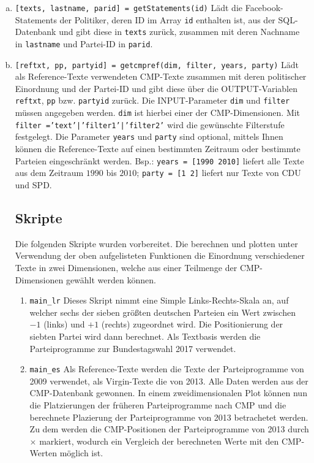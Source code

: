 \begin{enumerate}[(a)]
\item \label{getStatements} \texttt{[texts, lastname, parid] = getStatements(id)} \newline
    Lädt die Facebook-Statements der Politiker, deren ID im Array \texttt{id} enthalten ist, aus der SQL-Datenbank und gibt diese in \texttt{texts} zurück, zusammen mit deren Nachname in \texttt{lastname} und Partei-ID in \texttt{parid}.

\item \label{getcmpref} \texttt{[reftxt, pp, partyid] = getcmpref(dim, filter, years, party)} \newline
    Lädt als Reference-Texte verwendeten CMP-Texte zusammen mit deren politischer Einordnung und der Partei-ID und gibt diese über die OUTPUT-Variablen \texttt{reftxt}, \texttt{pp} bzw. \texttt{partyid} zurück. Die INPUT-Parameter \texttt{dim} und \texttt{filter} müssen angegeben werden. \texttt{dim} ist hierbei einer der CMP-Dimensionen. Mit \texttt{filter =}\linebreak\texttt{'text'|'filter1'|'filter2'} wird die gewünschte Filterstufe festgelegt. Die Parameter \texttt{years} und \texttt{party} sind optional, mittels Ihnen können die Reference-Texte auf einen bestimmten Zeitraum oder bestimmte Parteien eingeschränkt werden. Bsp.: \texttt{years = [1990 2010]} liefert alle Texte aus dem Zeitraum $1990$ bis $2010$; \texttt{party = [1 2]} liefert nur Texte von CDU und SPD.

\subsection{Skripte}
Die folgenden Skripte wurden vorbereitet. Die berechnen und plotten unter Verwendung der oben aufgelisteten Funktionen die Einordnung verschiedener Texte in zwei Dimensionen, welche aus einer Teilmenge der CMP-Dimensionen gewählt werden können.

\begin{enumerate}
\item \verb|main_lr| \newline
Dieses Skript nimmt eine Simple Links-Rechts-Skala an, auf welcher sechs der sieben größten deutschen Parteien ein Wert zwischen $-1$ (links) und $+1$ (rechts) zugeordnet wird. Die Positionierung der siebten Partei wird dann berechnet. Als Textbasis werden die Parteiprogramme zur Bundestagswahl 2017 verwendet.

\item \verb|main_es|
Als Reference-Texte werden die Texte der Parteiprogramme von 2009 verwendet, als Virgin-Texte die von 2013. Alle Daten werden aus der CMP-Datenbank gewonnen. In einem zweidimensionalen Plot können nun die Platzierungen der früheren Parteiprogramme nach CMP und die berechnete Plazierung der Parteiprogramme von 2013 betrachetet werden. Zu dem werden die CMP-Positionen der Parteiprogramme von 2013 durch $\times$ markiert, wodurch ein Vergleich der berechneten Werte mit den CMP-Werten möglich ist.


\end{enumerate}
\end{enumerate}
